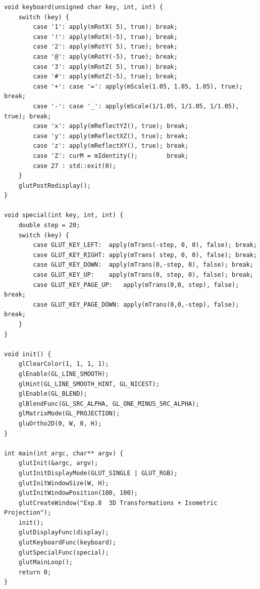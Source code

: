 \documentclass[a4paper,12pt]{ctexart}
\begin{document}
\begin{lstlisting}[style=cppstyle,caption={三维图形变换 + 正等测投影 —— 完整源代码}]
void keyboard(unsigned char key, int, int) {
    switch (key) {
        case '1': apply(mRotX( 5), true); break;
        case '!': apply(mRotX(-5), true); break;
        case '2': apply(mRotY( 5), true); break;
        case '@': apply(mRotY(-5), true); break;
        case '3': apply(mRotZ( 5), true); break;
        case '#': apply(mRotZ(-5), true); break;
        case '+': case '=': apply(mScale(1.05, 1.05, 1.05), true); break;
        case '-': case '_': apply(mScale(1/1.05, 1/1.05, 1/1.05), true); break;
        case 'x': apply(mReflectYZ(), true); break;
        case 'y': apply(mReflectXZ(), true); break;
        case 'z': apply(mReflectXY(), true); break;
        case 'Z': curM = mIdentity();        break;
        case 27 : std::exit(0);
    }
    glutPostRedisplay();
}

void special(int key, int, int) {
    double step = 20;
    switch (key) {
        case GLUT_KEY_LEFT:  apply(mTrans(-step, 0, 0), false); break;
        case GLUT_KEY_RIGHT: apply(mTrans( step, 0, 0), false); break;
        case GLUT_KEY_DOWN:  apply(mTrans(0,-step, 0), false); break;
        case GLUT_KEY_UP:    apply(mTrans(0, step, 0), false); break;
        case GLUT_KEY_PAGE_UP:   apply(mTrans(0,0, step), false); break;
        case GLUT_KEY_PAGE_DOWN: apply(mTrans(0,0,-step), false); break;
    }
}

void init() {
    glClearColor(1, 1, 1, 1);
    glEnable(GL_LINE_SMOOTH);
    glHint(GL_LINE_SMOOTH_HINT, GL_NICEST);
    glEnable(GL_BLEND);
    glBlendFunc(GL_SRC_ALPHA, GL_ONE_MINUS_SRC_ALPHA);
    glMatrixMode(GL_PROJECTION);
    gluOrtho2D(0, W, 0, H);
}

int main(int argc, char** argv) {
    glutInit(&argc, argv);
    glutInitDisplayMode(GLUT_SINGLE | GLUT_RGB);
    glutInitWindowSize(W, H);
    glutInitWindowPosition(100, 100);
    glutCreateWindow("Exp.8  3D Transformations + Isometric Projection");
    init();
    glutDisplayFunc(display);
    glutKeyboardFunc(keyboard);
    glutSpecialFunc(special);
    glutMainLoop();
    return 0;
}
\end{lstlisting}
\end{document}
